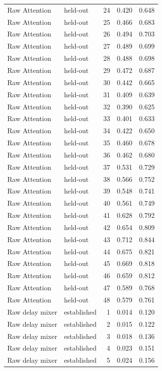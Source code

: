\begin{tabular}{llrrr}
Raw Attention & held-out & 24 & 0.420 & 0.648 \\
Raw Attention & held-out & 25 & 0.466 & 0.683 \\
Raw Attention & held-out & 26 & 0.494 & 0.703 \\
Raw Attention & held-out & 27 & 0.489 & 0.699 \\
Raw Attention & held-out & 28 & 0.488 & 0.698 \\
Raw Attention & held-out & 29 & 0.472 & 0.687 \\
Raw Attention & held-out & 30 & 0.442 & 0.665 \\
Raw Attention & held-out & 31 & 0.409 & 0.639 \\
Raw Attention & held-out & 32 & 0.390 & 0.625 \\
Raw Attention & held-out & 33 & 0.401 & 0.633 \\
Raw Attention & held-out & 34 & 0.422 & 0.650 \\
Raw Attention & held-out & 35 & 0.460 & 0.678 \\
Raw Attention & held-out & 36 & 0.462 & 0.680 \\
Raw Attention & held-out & 37 & 0.531 & 0.729 \\
Raw Attention & held-out & 38 & 0.566 & 0.752 \\
Raw Attention & held-out & 39 & 0.548 & 0.741 \\
Raw Attention & held-out & 40 & 0.561 & 0.749 \\
Raw Attention & held-out & 41 & 0.628 & 0.792 \\
Raw Attention & held-out & 42 & 0.654 & 0.809 \\
Raw Attention & held-out & 43 & 0.712 & 0.844 \\
Raw Attention & held-out & 44 & 0.675 & 0.821 \\
Raw Attention & held-out & 45 & 0.669 & 0.818 \\
Raw Attention & held-out & 46 & 0.659 & 0.812 \\
Raw Attention & held-out & 47 & 0.589 & 0.768 \\
Raw Attention & held-out & 48 & 0.579 & 0.761 \\
Raw delay mixer & established & 1 & 0.014 & 0.120 \\
Raw delay mixer & established & 2 & 0.015 & 0.122 \\
Raw delay mixer & established & 3 & 0.018 & 0.136 \\
Raw delay mixer & established & 4 & 0.023 & 0.151 \\
Raw delay mixer & established & 5 & 0.024 & 0.156 \\

\end{tabular}
